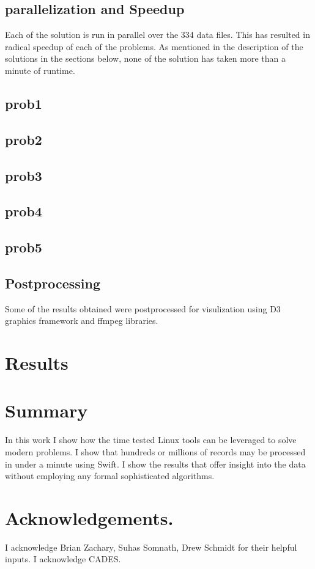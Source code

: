 \documentclass{report}
\begin{document}
\subsection*{parallelization and Speedup}
Each of the solution is run in parallel over the 334 data files. This has
resulted in radical speedup of each of the problems. As mentioned in the
description of the solutions in the sections below, none of the solution has
taken more than a minute of runtime.

\subsection*{prob1}

\subsection*{prob2}

\subsection*{prob3}

\subsection*{prob4}

\subsection*{prob5}

\subsection*{Postprocessing}
Some of the results obtained were postprocessed for visulization using D3
graphics framework and ffmpeg libraries.

\section*{Results}

\section*{Summary}
In this work I show how the time tested Linux tools can be leveraged to solve
modern problems. I show that hundreds or millions of records may be processed
in under a minute using Swift. I show the results that offer insight into the
data without employing any formal sophisticated algorithms.

\section*{Acknowledgements.}
I acknowledge Brian Zachary, Suhas Somnath, Drew Schmidt for their helpful
inputs. I acknowledge CADES.
\end{document}

